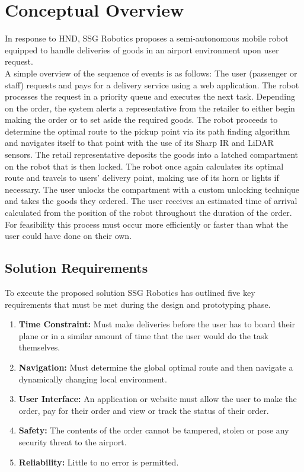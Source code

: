\documentclass[letterpaper,fleqn,oneside]{template}
\begin{document}
\section{Conceptual Overview}

In response to HND, SSG Robotics proposes a semi-autonomous mobile robot equipped to handle deliveries of goods in an airport environment upon user request.\\

A simple overview of the sequence of events is as follows: The user (passenger or staff) requests and pays for a delivery service using a web application. The robot processes the request in a priority queue and executes the next task. Depending on the order, the system alerts a representative from the retailer to either begin making the order or to set aside the required goods. The robot proceeds to determine the optimal route to the pickup point via its path finding algorithm and navigates itself to that point with the use of its Sharp IR and LiDAR sensors. The retail representative deposits the goods into a latched compartment on the robot that is then locked. The robot once again calculates its optimal route and travels to users’ delivery point, making use of its horn or lights if necessary. The user unlocks the compartment with a custom unlocking technique and takes the goods they ordered. The user receives an estimated time of arrival calculated from the position of the robot throughout the duration of the order. For feasibility this process must occur more efficiently or faster than what the user could have done on their own.

\subsection{Solution Requirements}

To execute the proposed solution SSG Robotics has outlined five key requirements that must be met during the design and prototyping phase. 

\begin{enumerate}
    \item \textbf{Time Constraint:} Must make deliveries before the user has to board their plane or in a similar amount of time that the user would do the task themselves.
    \item \textbf{Navigation:} Must determine the global optimal route and then navigate a dynamically changing local environment.
    \item \textbf{User Interface:} An application or website must allow the user to make the order, pay for their order and view or track the status of their order.
    \item \textbf{Safety:} The contents of the order cannot be tampered, stolen or pose any security threat to the airport.
    \item \textbf{Reliability:} Little to no error is permitted.
\end{enumerate}
\end{document}
